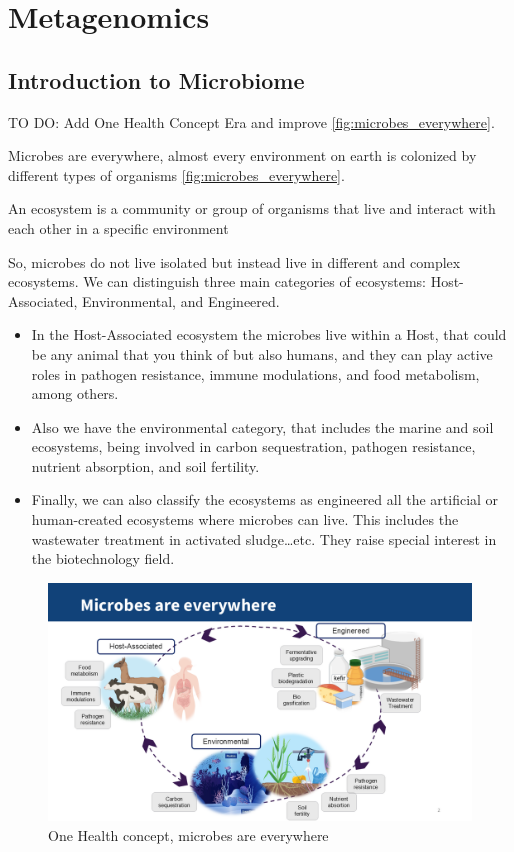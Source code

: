 \chapter{Metagenomics}\label{chp:metagenomics}

\minitoc
\section{Introduction to Microbiome}
TO DO: Add One Health Concept Era and improve \autoref{fig:microbes_everywhere}.

Microbes are everywhere, almost every environment on earth is colonized by different types of organisms \autoref{fig:microbes_everywhere}. 

\begin{definition}[Ecosystem]
    An ecosystem is a community or group of organisms that live and interact with each other in a specific environment
\end{definition}
So, microbes do not live isolated but instead live in different and complex ecosystems. We can distinguish three main 
categories of ecosystems: Host-Associated, Environmental, and Engineered.
\begin{itemize}
    \item In the Host-Associated ecosystem the microbes live within a Host, that could be any animal that you think of 
    but also humans, and they can play active roles in pathogen resistance, immune modulations, and food metabolism, among others.
    \item Also we have the environmental category, that includes the marine and soil ecosystems, being involved in carbon 
    sequestration, pathogen resistance, nutrient absorption, and soil fertility.
    \item Finally, we can also classify the ecosystems as engineered all the artificial or human-created ecosystems 
    where microbes can live. This includes the wastewater treatment in activated sludge…etc. They raise special interest 
    in the biotechnology field.
\end{itemize}
\begin{figure}[!ht]
    \centering
    \includegraphics[width=1\linewidth]{./figure/microbes_everywhere.png}
    \caption{One Health concept, microbes are everywhere}
    \label{fig:microbes_everywhere}
\end{figure}

